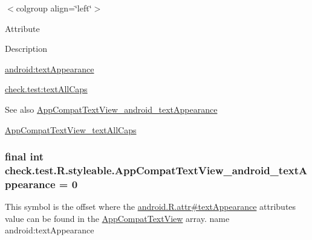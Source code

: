 \begin{TabularC}{0}
\hline
\end{TabularC}
$<$colgroup align=\char`\"{}left\char`\"{}$>$ 

Attribute

Description 

{\ttfamily \hyperlink{classcheck_1_1test_1_1_r_1_1styleable_aa7f15943a9e9325a18e9aca717b54afe}{android\+:text\+Appearance}}

{\ttfamily \hyperlink{classcheck_1_1test_1_1_r_1_1styleable_aafcec9edff038010ef0a530321a8dea1}{check.\+test\+:text\+All\+Caps}}

\begin{DoxySeeAlso}{See also}
\hyperlink{classcheck_1_1test_1_1_r_1_1styleable_aa7f15943a9e9325a18e9aca717b54afe}{App\+Compat\+Text\+View\+\_\+android\+\_\+text\+Appearance} 

\hyperlink{classcheck_1_1test_1_1_r_1_1styleable_aafcec9edff038010ef0a530321a8dea1}{App\+Compat\+Text\+View\+\_\+text\+All\+Caps} 
\end{DoxySeeAlso}
\hypertarget{classcheck_1_1test_1_1_r_1_1styleable_aa7f15943a9e9325a18e9aca717b54afe}{}
\subsubsection[{App\+Compat\+Text\+View\+\_\+android\+\_\+text\+Appearance}]{\setlength{\rightskip}{0pt plus 5cm}final int check.\+test.\+R.\+styleable.\+App\+Compat\+Text\+View\+\_\+android\+\_\+text\+Appearance = 0\hspace{0.3cm}{\ttfamily [static]}}\label{classcheck_1_1test_1_1_r_1_1styleable_aa7f15943a9e9325a18e9aca717b54afe}
This symbol is the offset where the \hyperlink{}{android.\+R.\+attr\#text\+Appearance} attribute\textquotesingle{}s value can be found in the \hyperlink{classcheck_1_1test_1_1_r_1_1styleable_a07bf5a828a4906262f29b961bc851581}{App\+Compat\+Text\+View} array.  name android\+:text\+Appearance \hypertarget{classcheck_1_1test_1_1_r_1_1styleable_aafcec9edff038010ef0a530321a8dea1}{}
